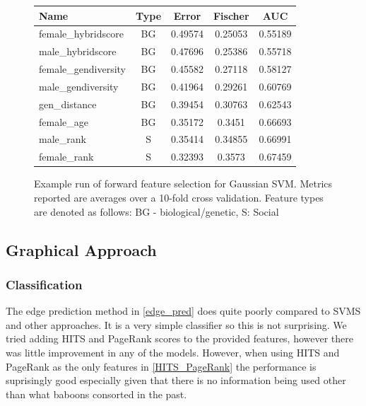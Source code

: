 \documentclass[twoside,twocolumn,paper=letter,fontsize=11pt]{article}
\begin{document}
\begin{figure}
      \centering
      \begin{tabular}{|l|c|c|c|c|}
        \hline
        Name & Type & Error & Fischer & AUC \\
        \hline
        female\_hybridscore  & BG  & 0.49574 & 0.25053 & 0.55189\\
        male\_hybridscore  & BG  & 0.47696 & 0.25386 & 0.55718\\
        female\_gendiversity & BG  & 0.45582 & 0.27118 & 0.58127\\
        male\_gendiversity & BG  & 0.41964 & 0.29261 & 0.60769\\
        gen\_distance & BG  & 0.39454 & 0.30763 & 0.62543\\
        female\_age &  BG  & 0.35172 & 0.3451  & 0.66693\\
        male\_rank & S & 0.35414 & 0.34855 & 0.66991\\
        female\_rank & S & 0.32393 & 0.3573  & 0.67459\\
        \hline
      \end{tabular}
  \caption{Example run of forward feature selection for Gaussian SVM. Metrics
    reported are averages over a 10-fold cross validation.
  Feature types are denoted as follows: BG - biological/genetic, S: Social}
  \label{fig:rbf_svm_feat_selection}
\end{figure}


\subsection{Graphical Approach}
\subsubsection*{Classification}

The edge prediction method in \ref{edge_pred} does quite poorly compared to SVMS and other approaches. It is a very simple classifier so this is not surprising. We tried adding HITS and PageRank scores to the provided features, however there was little improvement in any of the models. However, when using HITS and PageRank as the only features in  \ref{HITS_PageRank} the performance is suprisingly good especially given that there is no information being used other than what baboons consorted in the past. %
\end{document}

